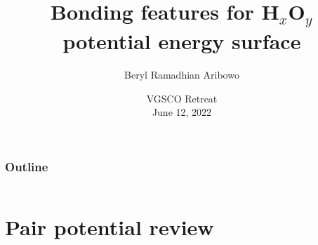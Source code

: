 \documentclass{beamer}
\title{Bonding features for H$_x$O$_y$ potential energy surface}
\author[Aribowo, Neumaier] %
{Beryl Ramadhian Aribowo}
\institute[VFM] %
{
    Joint work with Prof. Arnold Neumaier\\
    Faculty of Mathematics\\
    University of Vienna \\

}
\date[]{VGSCO Retreat \\ June 12, 2022}
\begin{document}
\frame{\titlepage}

\begin{frame}
    \frametitle{Outline}
    \begin{columns}[t]
        \begin{column}{.5\textwidth}
            \tableofcontents[sections={1-2}]
        \end{column}
        \begin{column}{.5\textwidth}
            \tableofcontents[sections={3-5}]
        \end{column}
    \end{columns}
\end{frame}


\section{Pair potential review}
\end{document}
